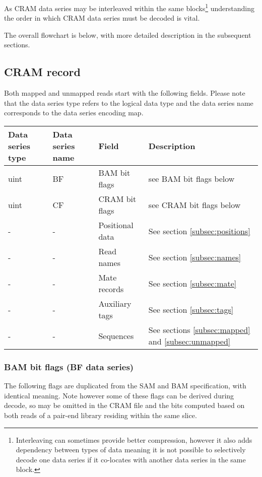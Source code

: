\documentclass[a4paper]{article}
\begin{document}
As CRAM data series may be interleaved within the same blocks\footnote{Interleaving can sometimes provide better compression, however it also adds dependency between types of data meaning it is not possible to selectively decode one data series if it co-locates with another data series in the same block.} understanding the order in which CRAM data series must be decoded is vital.

The overall flowchart is below, with more detailed description in the subsequent sections.

\algnewcommand{}

\subsection{CRAM record}

Both mapped and unmapped reads start with the following fields. Please note that 
the data series type refers to the logical data type and the data series name corresponds 
to the data series encoding map.

\begin{tabular}{|>{\raggedright}p{70pt}|>{\raggedright}p{75pt}|>{\raggedright}p{90pt}|>{\raggedright}p{171pt}|}
\hline
\textbf{Data series type} & \textbf{Data series name} & \textbf{Field} & \textbf{Description}\tabularnewline
\hline
uint & BF & BAM bit flags & see BAM bit flags below\tabularnewline
\hline
uint & CF & CRAM bit flags & see CRAM bit flags below\tabularnewline
\hline
- & - & Positional data & See section \ref{subsec:positions}\tabularnewline
\hline
- & - & Read names & See section \ref{subsec:names}\tabularnewline
\hline
- & - & Mate records & See section \ref{subsec:mate}\tabularnewline
\hline
- & - & Auxiliary tags & See section \ref{subsec:tags}\tabularnewline
\hline
- & - & Sequences & See sections \ref{subsec:mapped} and \ref{subsec:unmapped}\tabularnewline
\hline
\end{tabular}

\subsubsection*{BAM bit flags (BF data series)}

The following flags are duplicated from the SAM and BAM specification, with identical meaning.
Note however some of these flags can be derived during decode, so may be omitted in the CRAM file and the bits computed based on both reads of a pair-end library residing within the same slice.
\end{document}
